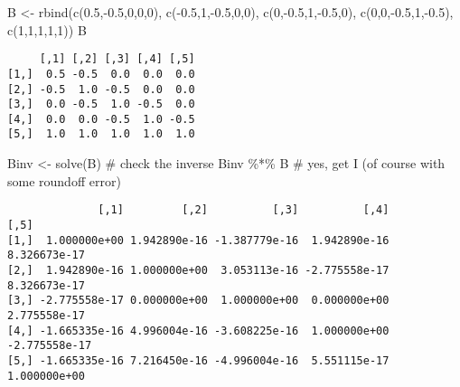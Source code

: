 \documentclass[
  letterpaper,
  DIV=11,
  numbers=noendperiod,
  oneside]{scrreprt}
\newenvironment{Shaded}{\begin{snugshade}}{\end{snugshade}}
\newcommand{\CommentTok}[1]{\textcolor[rgb]{0.37,0.37,0.37}{#1}}
\newcommand{\DecValTok}[1]{\textcolor[rgb]{0.68,0.00,0.00}{#1}}
\newcommand{\FloatTok}[1]{\textcolor[rgb]{0.68,0.00,0.00}{#1}}
\newcommand{\FunctionTok}[1]{\textcolor[rgb]{0.28,0.35,0.67}{#1}}
\newcommand{\NormalTok}[1]{\textcolor[rgb]{0.00,0.23,0.31}{#1}}
\newcommand{\OtherTok}[1]{\textcolor[rgb]{0.00,0.23,0.31}{#1}}
\newcommand{\SpecialCharTok}[1]{\textcolor[rgb]{0.37,0.37,0.37}{#1}}
\begin{document}
\begin{Shaded}
\begin{Highlighting}[]
\NormalTok{B }\OtherTok{\textless{}{-}}
\FunctionTok{rbind}\NormalTok{(}\FunctionTok{c}\NormalTok{(}\FloatTok{0.5}\NormalTok{,}\SpecialCharTok{{-}}\FloatTok{0.5}\NormalTok{,}\DecValTok{0}\NormalTok{,}\DecValTok{0}\NormalTok{,}\DecValTok{0}\NormalTok{), }\FunctionTok{c}\NormalTok{(}\SpecialCharTok{{-}}\FloatTok{0.5}\NormalTok{,}\DecValTok{1}\NormalTok{,}\SpecialCharTok{{-}}\FloatTok{0.5}\NormalTok{,}\DecValTok{0}\NormalTok{,}\DecValTok{0}\NormalTok{), }\FunctionTok{c}\NormalTok{(}\DecValTok{0}\NormalTok{,}\SpecialCharTok{{-}}\FloatTok{0.5}\NormalTok{,}\DecValTok{1}\NormalTok{,}\SpecialCharTok{{-}}\FloatTok{0.5}\NormalTok{,}\DecValTok{0}\NormalTok{),}
   \FunctionTok{c}\NormalTok{(}\DecValTok{0}\NormalTok{,}\DecValTok{0}\NormalTok{,}\SpecialCharTok{{-}}\FloatTok{0.5}\NormalTok{,}\DecValTok{1}\NormalTok{,}\SpecialCharTok{{-}}\FloatTok{0.5}\NormalTok{), }\FunctionTok{c}\NormalTok{(}\DecValTok{1}\NormalTok{,}\DecValTok{1}\NormalTok{,}\DecValTok{1}\NormalTok{,}\DecValTok{1}\NormalTok{,}\DecValTok{1}\NormalTok{))}
\NormalTok{B}
\end{Highlighting}
\end{Shaded}

\begin{verbatim}
     [,1] [,2] [,3] [,4] [,5]
[1,]  0.5 -0.5  0.0  0.0  0.0
[2,] -0.5  1.0 -0.5  0.0  0.0
[3,]  0.0 -0.5  1.0 -0.5  0.0
[4,]  0.0  0.0 -0.5  1.0 -0.5
[5,]  1.0  1.0  1.0  1.0  1.0
\end{verbatim}

\begin{Shaded}
\begin{Highlighting}[]
\NormalTok{Binv }\OtherTok{\textless{}{-}} \FunctionTok{solve}\NormalTok{(B)}
\CommentTok{\# check the inverse}
\NormalTok{Binv }\SpecialCharTok{\%*\%}\NormalTok{ B  }\CommentTok{\# yes, get I (of course with some roundoff error)}
\end{Highlighting}
\end{Shaded}

\begin{verbatim}
              [,1]         [,2]          [,3]          [,4]          [,5]
[1,]  1.000000e+00 1.942890e-16 -1.387779e-16  1.942890e-16  8.326673e-17
[2,]  1.942890e-16 1.000000e+00  3.053113e-16 -2.775558e-17  8.326673e-17
[3,] -2.775558e-17 0.000000e+00  1.000000e+00  0.000000e+00  2.775558e-17
[4,] -1.665335e-16 4.996004e-16 -3.608225e-16  1.000000e+00 -2.775558e-17
[5,] -1.665335e-16 7.216450e-16 -4.996004e-16  5.551115e-17  1.000000e+00
\end{verbatim}
\end{document}
